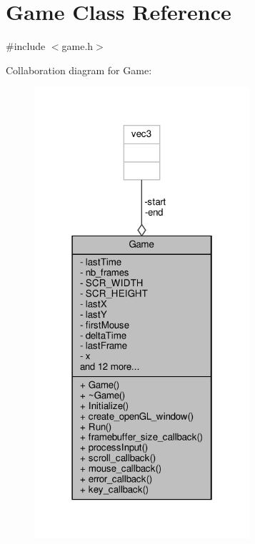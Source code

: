 \hypertarget{classGame}{}\section{Game Class Reference}
\label{classGame}


{\ttfamily \#include $<$game.\+h$>$}



Collaboration diagram for Game\+:
\nopagebreak
\begin{figure}[H]
\begin{center}
\leavevmode
\includegraphics[width=226pt]{classGame__coll__graph}
\end{center}
\end{figure}
